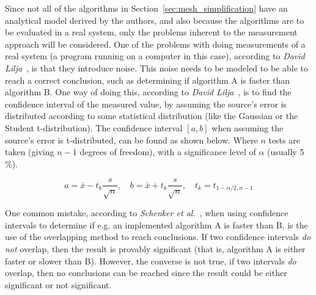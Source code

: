 Since not all of the algorithms in Section~\ref{sec:mesh_simplification} have an analytical model derived by the authors, and also because the algorithms are to be evaluated in a real system, only the problems inherent to the measurement approach will be considered. One of the problems with doing measurements of a real system (a program running on a computer in this case), according to \emph{David Lilja}~\cite[p.~43]{lilja2005measuring}, is that they introduce noise. This noise needs to be modeled to be able to reach a correct conclusion, such as determining if algorithm A is faster than algorithm B. One way of doing this, according to \emph{David Lilja}~\cite[p.~48]{lilja2005measuring}, is to find the confidence interval of the measured value, by assuming the source's error is distributed according to some statistical distribution (like the Gaussian or the Student t-distribution). The confidence interval \([a,b]\) when assuming the source's error is t-distributed, can be found as shown below. Where \(n\) tests are taken (giving \(n-1\) degrees of freedom), with a significance level of \(\alpha\) (usually 5 \%).

\begin{equation} a = \bar{x} - t_k\frac{s}{\sqrt{n}}, \quad
   b = \bar{x} + t_k\frac{s}{\sqrt{n}}, \quad
t_k = t_{1-\alpha/2,n-1} \end{equation}

One common mistake, according to \emph{Schenker et al.}~\cite{schenker2001judging}, when using confidence intervals to determine if e.g. an implemented algorithm A is faster than B, is the use of the overlapping method to reach conclusions. If two confidence intervals \emph{do not} overlap, then the result is provably significant (that is, algorithm A is either faster or slower than B). However, the converse is not true, if two intervals \emph{do} overlap, then no conclusions can be reached since the result could be either significant or not significant.


